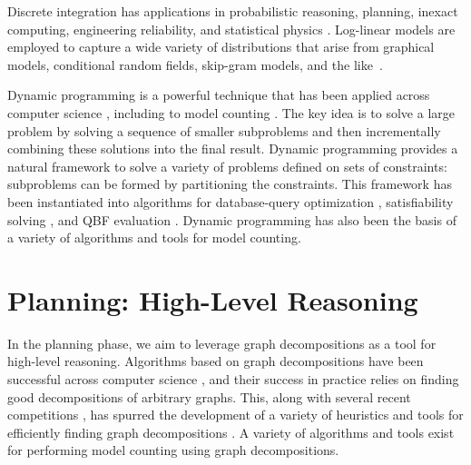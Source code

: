 


Discrete integration has applications in probabilistic reasoning, planning, inexact computing, engineering reliability, and statistical physics \cite{Bacchus2003,DH07,GSS08,naveh2007constraint}. Log-linear models are employed to capture a wide variety of distributions that arise from graphical models, conditional random fields, skip-gram models, and the like~\cite{KF09}.

Dynamic programming is a powerful technique that has been applied across computer science \cite{bellman1966dynamic}, including to model counting \cite{BDP09,SS10,jegou2016improving}.
The key idea is to solve a large problem by solving a sequence of smaller subproblems and then incrementally combining these solutions into the final result.
Dynamic programming provides a natural framework to solve a variety of problems defined on sets of constraints: subproblems can be formed by partitioning the constraints.
This framework has been instantiated into algorithms for database-query optimization \cite{MPPV04}, satisfiability solving \cite{uribe1994ordered,aguirre2001random,pan2005symbolic}, and QBF evaluation \cite{charwat2016bdd}. 
Dynamic programming has also been the basis of a variety of algorithms \cite{FMR08,SS10} and tools \cite{CW16,FHMW17,FHWZ18,FHZ19,DPV20,fichte2020exploiting} for model counting.

\section{Planning: High-Level Reasoning}
In the planning phase, we aim to leverage graph decompositions as a tool for high-level reasoning.
Algorithms based on graph decompositions have been successful across computer science \cite{GLST17,MPPV04}, and their success in practice relies on finding good decompositions of arbitrary graphs. 
This, along with several recent competitions \cite{DKTW18}, has spurred the development of a variety of heuristics and tools for efficiently finding graph decompositions \cite{AMW17,HS18,Tamaki17,hicks02}. 
A variety of algorithms \cite{FMR08,SS10} and tools \cite{CW16,FHMW17,FHWZ18,FHZ19} exist for performing model counting using graph decompositions.

